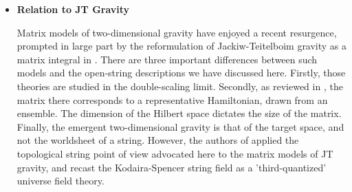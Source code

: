 \documentclass[english]{article}
\begin{document}
\begin{itemize}
    How does the B-twisted sigma-model with target space given by Eq.~(\ref{eq:cy3target}) relate to the Landau-Ginzburg description we have explored in this paper? In \cite{Aganagic_2005} -  see Eq.~(5.7) - it was suggested that the B-model with LG superpotential $W(y)$ corresponds to a target space geometry via 
    \begin{equation}\label{eq:CY-superpot}
        uv-(x-W(y))=0 .
    \end{equation}
    This was motivated by the LG/Calabi-Yau correspondence for strings propagating on ADE singularities \cite{MartinecManual,vafa1989catastrophes}. 
    In our case with $W(y)=\frac{1}{y}+t_2y$, we see on substitution into Eq.~(\ref{eq:CY-superpot}), that (for $y\neq 0$), we have the equation
    \begin{equation}
        uvy-(xy-t_2y^2)=1 .
    \end{equation}
    After a redefinition of variables $uy \rightarrow u$ and a shift of $(x,y)$ this is the equation of a deformed conifold\footnote{In \cite{OV2002worldsheet, okuda2004d}, the superpotential $W(Z)=1/Z$ was proposed as the LG description of the deformed conifold (i.e. without the background momentum deformation which gives the linear term). This appears to be somewhat in tension with our result. It would be desirable to clarify the exact relationship with these proposals.}. 
    
\item \textbf{Relation to JT Gravity}   

    Matrix models of two-dimensional gravity have enjoyed a recent resurgence, prompted in large part by the reformulation of Jackiw-Teitelboim gravity as a matrix integral in \cite{SSSJTmatrix}. There are three important differences between such  models and the open-string descriptions we have discussed here. Firstly, those theories are studied in the double-scaling limit. Secondly, as reviewed in \cite{CJohnsonReview}, the matrix there corresponds to a representative Hamiltonian, drawn from an ensemble. The dimension of the Hilbert space dictates the size of the matrix. Finally, the emergent two-dimensional gravity is that of the target space, and not the worldsheet of a string. However, the authors of \cite{EVerlindeJTstring} applied the topological string point of view advocated here to the matrix models of JT gravity, and recast the Kodaira-Spencer \cite{KodairaSpencer} string field as a 'third-quantized' universe field theory.


\end{itemize}
\end{document}
